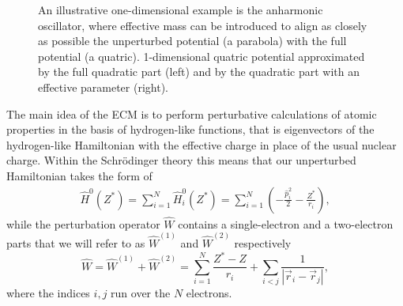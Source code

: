 \begin{figure}
  \centering  
  \caption{An illustrative one-dimensional example is the anharmonic oscillator, where effective mass can be introduced to align as closely as possible the unperturbed potential (a parabola) with the full potential (a quatric). 1-dimensional quatric potential approximated by the full quadratic part (left) and by the quadratic part with an effective parameter (right).}
  \label{EffParamFig}
\end{figure}

The main idea of the ECM is to perform perturbative calculations of atomic properties in the basis of hydrogen-like functions, that is eigenvectors of the hydrogen-like Hamiltonian with the effective charge in place of the usual nuclear charge. Within the Schr\"odinger theory this means that our unperturbed Hamiltonian takes the form of
\begin{align}
\widehat{H}^0 (Z^*) = \sum_{i = 1}^{N} \widehat{H}^0_i(Z^*) = \sum_{i = 1}^{N}\left(-\frac{\widehat{p}_{i}^{2}}{2} - \frac{Z^*}{r_{i}}\right),
\end{align}
while the perturbation operator $\widehat{W}$ contains a single-electron and a two-electron parts that we will refer to as $\widehat{W}^{(1)}$ and $\widehat{W}^{(2)}$ respectively
\begin{equation} \label{Wdef}
\widehat{W} = \widehat{W}^{(1)} + \widehat{W}^{(2)} = \sum_{i=1}^{N} \frac{Z^*-Z}{r_i} +
\sum_{i<j}\frac{1}{|\vec{r}_i-\vec{r}_j|},
\end{equation}
where the indices $i,j$ run over the $N$ electrons.

